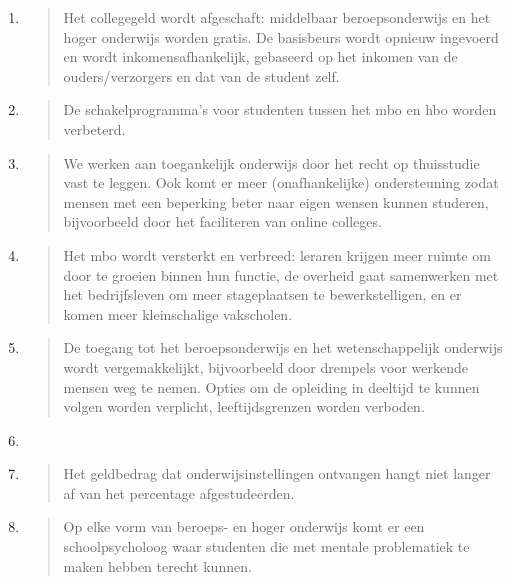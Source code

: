 \begin{enumerate}
\def\labelenumi{\arabic{enumi}.}
\item
  \begin{quote}
  Het collegegeld wordt afgeschaft: middelbaar beroepsonderwijs en het
  hoger onderwijs worden gratis. De basisbeurs wordt opnieuw ingevoerd
  en wordt inkomensafhankelijk, gebaseerd op het inkomen van de
  ouders/verzorgers en dat van de student zelf.
  \end{quote}
\item
  \begin{quote}
  De schakelprogramma's voor studenten tussen het mbo en hbo worden
  verbeterd.
  \end{quote}
\item
  \begin{quote}
  We werken aan toegankelijk onderwijs\hspace{0pt} door het recht op
  thuisstudie vast te leggen. Ook komt er meer (onafhankelijke)
  ondersteuning zodat mensen met een beperking beter naar eigen wensen
  kunnen studeren, bijvoorbeeld door het faciliteren van online
  colleges.
  \end{quote}
\item
  \begin{quote}
  Het mbo wordt versterkt en verbreed: leraren krijgen meer ruimte om
  door te groeien binnen hun functie, de overheid gaat samenwerken met
  het bedrijfsleven om meer stageplaatsen te bewerkstelligen, en er
  komen meer kleinschalige vakscholen.
  \end{quote}
\item
  \begin{quote}
  De toegang tot het beroepsonderwijs en het wetenschappelijk onderwijs
  wordt vergemakkelijkt, bijvoorbeeld door drempels voor werkende mensen
  weg te nemen. Opties om de opleiding in deeltijd te kunnen volgen
  worden verplicht, leeftijdsgrenzen worden verboden.
  \end{quote}
\item
\item
  \begin{quote}
  Het geldbedrag dat onderwijsinstellingen ontvangen hangt niet langer
  af van het percentage afgestudeerden.
  \end{quote}
\item
  \begin{quote}
  Op elke vorm van beroeps- en hoger onderwijs komt er een
  schoolpsycholoog waar studenten die met mentale problematiek te maken
  hebben terecht kunnen.
  \end{quote}
\end{enumerate}

